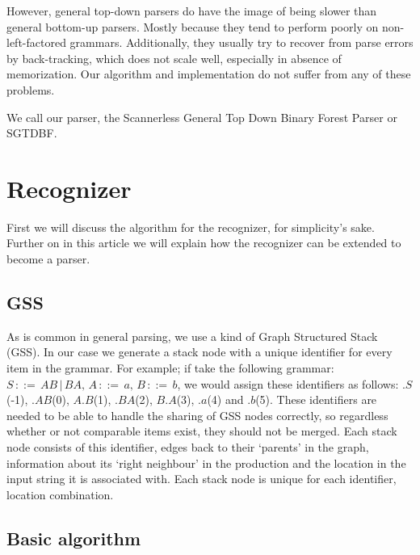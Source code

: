 \documentclass[a4paper,10pt]{article}
\begin{document}
However, general top-down parsers do have the image of being slower than general bottom-up parsers. Mostly because they tend to perform poorly on non-left-factored grammars. Additionally, they usually try to recover from parse errors by back-tracking, which does not scale well, especially in absence of memorization. Our algorithm and implementation do not suffer from any of these problems.

We call our parser, the Scannerless General Top Down Binary Forest Parser or SGTDBF.

\section{Recognizer}

First we will discuss the algorithm for the recognizer, for simplicity's sake. Further on in this article we will explain how the recognizer can be extended to become a parser.

\subsection{GSS}

As is common in general parsing, we use a kind of Graph Structured Stack (GSS). In our case we generate a stack node with a unique identifier for every item in the grammar. For example; if take the following grammar: $S\,::=\,AB\,|\,BA,\,A\,::=\,a,\,B\,::=\,b$, we would assign these identifiers as follows: $.S$(-1), $.AB$(0), $A.B$(1), $.BA$(2), $B.A$(3), $.a$(4) and $.b$(5). These identifiers are needed to be able to handle the sharing of GSS nodes correctly, so regardless whether or not comparable items exist, they should not be merged. Each stack node consists of this identifier, edges back to their `parents' in the graph, information about its `right neighbour' in the production and the location in the input string it is associated with. Each stack node is unique for each identifier, location combination.

\subsection{Basic algorithm}
\end{document}
